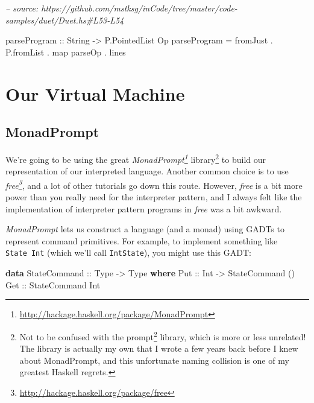 \documentclass[]{article}
\newenvironment{Shaded}{}{}
\newcommand{\CommentTok}[1]{\textcolor[rgb]{0.38,0.63,0.69}{\textit{#1}}}
\newcommand{\DataTypeTok}[1]{\textcolor[rgb]{0.56,0.13,0.00}{#1}}
\newcommand{\FunctionTok}[1]{\textcolor[rgb]{0.02,0.16,0.49}{#1}}
\newcommand{\KeywordTok}[1]{\textcolor[rgb]{0.00,0.44,0.13}{\textbf{#1}}}
\newcommand{\NormalTok}[1]{#1}
\newcommand{\OtherTok}[1]{\textcolor[rgb]{0.00,0.44,0.13}{#1}}
\renewcommand{\href}[2]{#2\footnote{\url{#1}}}
\begin{document}
\begin{Shaded}
\begin{Highlighting}[]
\CommentTok{-- source: https://github.com/mstksg/inCode/tree/master/code-samples/duet/Duet.hs#L53-L54}

\OtherTok{parseProgram ::} \DataTypeTok{String} \OtherTok{->} \DataTypeTok{P.PointedList} \DataTypeTok{Op}
\NormalTok{parseProgram }\FunctionTok{=}\NormalTok{ fromJust }\FunctionTok{.}\NormalTok{ P.fromList }\FunctionTok{.}\NormalTok{ map parseOp }\FunctionTok{.}\NormalTok{ lines}
\end{Highlighting}
\end{Shaded}

\hypertarget{our-virtual-machine}{%
\section{Our Virtual Machine}\label{our-virtual-machine}}

\hypertarget{monadprompt}{%
\subsection{MonadPrompt}\label{monadprompt}}

We're going to be using the great
\emph{\href{http://hackage.haskell.org/package/MonadPrompt}{MonadPrompt}}
library\footnote{Not to be confused with the
  \href{http://hackage.haskell.org/package/prompt}{prompt} library, which is
  more or less unrelated! The library is actually my own that I wrote a few
  years back before I knew about MonadPrompt, and this unfortunate naming
  collision is one of my greatest Haskell regrets.} to build our representation
of our interpreted language. Another common choice is to use
\emph{\href{http://hackage.haskell.org/package/free}{free}}, and a lot of other
tutorials go down this route. However, \emph{free} is a bit more power than you
really need for the interpreter pattern, and I always felt like the
implementation of interpreter pattern programs in \emph{free} was a bit awkward.

\emph{MonadPrompt} lets us construct a language (and a monad) using GADTs to
represent command primitives. For example, to implement something like
\texttt{State\ Int} (which we'll call \texttt{IntState}), you might use this
GADT:

\begin{Shaded}
\begin{Highlighting}[]
\KeywordTok{data} \DataTypeTok{StateCommand}\OtherTok{ ::} \DataTypeTok{Type} \OtherTok{->} \DataTypeTok{Type} \KeywordTok{where}
    \DataTypeTok{Put}\OtherTok{ ::} \DataTypeTok{Int} \OtherTok{->} \DataTypeTok{StateCommand}\NormalTok{ ()}
    \DataTypeTok{Get}\OtherTok{ ::} \DataTypeTok{StateCommand} \DataTypeTok{Int}
\end{Highlighting}
\end{Shaded}
\end{document}
